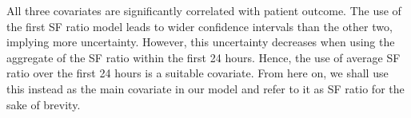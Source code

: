 All three covariates are significantly correlated with patient outcome. The use of the first SF ratio model leads to wider confidence intervals than the other two, implying more uncertainty. However, this uncertainty decreases when using the aggregate of the SF ratio within the first 24 hours. Hence, the use of average SF ratio over the first 24 hours is a suitable covariate. From here on,  we shall use this instead as the main covariate in our model and refer to it as SF ratio for the sake of brevity.  

